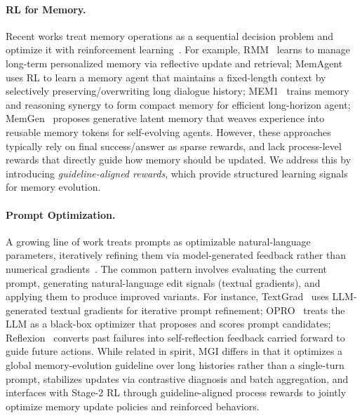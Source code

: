 \paragraph{RL for Memory.}
Recent works treat memory operations as a sequential decision problem and optimize it with reinforcement learning~\cite{zhang2026evoking,wang2025memalpha,zhou2025mem1,memory-r1,m3-agent,yuan2025memsearcher,zhang2025MemoryasAction,liu2025large,li2025towards}.
For example, RMM~\cite{RMM} learns to manage long-term personalized memory via reflective update and retrieval; MemAgent~\cite{yu2025memagent} uses RL to learn a memory agent that maintains a fixed-length context by selectively preserving/overwriting long dialogue history; MEM1~\cite{zhou2025mem1} trains memory and reasoning synergy to form compact memory for efficient long-horizon agent; MemGen~\cite{zhang2025memgen} proposes generative latent memory that weaves experience into reusable memory tokens for self-evolving agents.
However, these approaches typically rely on final success/answer as sparse rewards, and lack process-level rewards that directly guide how memory should be updated. We address this by introducing \emph{guideline-aligned rewards}, which provide structured learning signals for memory evolution.

\paragraph{Prompt Optimization.}
A growing line of work treats prompts as optimizable natural-language parameters, iteratively refining them via model-generated feedback rather than numerical gradients~\cite{yuksekgonul2025optimizing,yang2023large,pryzant2023automatic,shinn2023reflexion,tang2025unleashing,zhang2024offline,zhang2024revolve,zhang2024aflow}.
The common pattern involves evaluating the current prompt, generating natural-language edit signals (textual gradients), and applying them to produce improved variants.
For instance, TextGrad~\cite{yuksekgonul2025optimizing} uses LLM-generated textual gradients for iterative prompt refinement; OPRO~\cite{yang2023large} treats the LLM as a black-box optimizer that proposes and scores prompt candidates; Reflexion~\cite{shinn2023reflexion} converts past failures into self-reflection feedback carried forward to guide future actions.
While related in spirit, MGI differs in that it optimizes a global memory-evolution guideline over long histories rather than a single-turn prompt, stabilizes updates via contrastive diagnosis and batch aggregation, and interfaces with Stage-2 RL through guideline-aligned process rewards to jointly optimize memory update policies and reinforced behaviors.